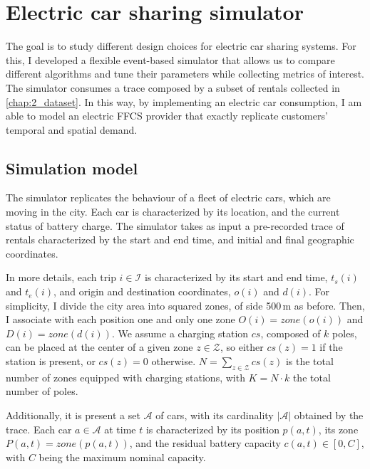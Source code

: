 \section{Electric car sharing simulator}
\label{sec:5_2_modelling}

The goal is to study different design choices for electric car sharing systems. For this, I developed a flexible event-based simulator that allows us to compare different algorithms and tune their parameters while collecting metrics of interest. The simulator consumes a trace composed by a subset of rentals collected in \ref{chap:2_dataset}. In this way, by implementing an electric car consumption, I am able to model an electric FFCS provider that exactly replicate customers' temporal and spatial demand.

\subsection{Simulation model}

The simulator replicates the behaviour of a fleet of electric cars, which are moving in the city. Each car is characterized by its location, and the current status of battery charge. The simulator takes as input a pre-recorded trace of rentals characterized by the start and end time, and initial and final geographic coordinates.

In more details, each trip $i \in \mathcal{I}$  is characterized by its start and end time, $t_{s}(i)$ and $t_{e}(i)$, and origin and destination coordinates, $o(i)$ and $d(i)$. For simplicity, I divide the city area into squared zones, of side 500\,m as before. Then, I associate with each position one and only one zone $O(i)=zone(o(i))$ and $D(i)=zone(d(i))$. We assume a charging station $cs$, composed of $k$ poles, can be placed at the center of a given zone $z\in \mathcal{Z}$, so either $cs(z)=1$ if the station is present, or $cs(z)=0$ otherwise. $N=\sum_{z\in \mathcal{Z}}cs(z)$ is the total number of zones equipped with charging stations, with 
$K=N\cdot k$ the total number of poles.


Additionally, it is present a set $\mathcal{A}$ of cars, with its cardinality $\left\vert{\mathcal{A}}\right\vert$ obtained by the trace. Each car $a\in \mathcal{A}$ at time $t$ is characterized by its position $p(a,t)$, its zone $P(a,t)=zone(p(a,t))$, and the residual battery capacity $c(a,t)\in[0,C]$, with $C$ being the maximum nominal capacity.

